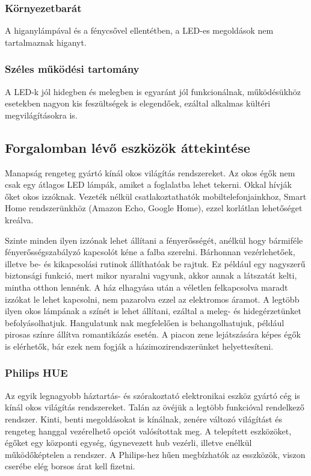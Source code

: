 \documentclass[../main.tex]{subfiles}
\begin{document}
        \subsubsection{Környezetbarát}
            A higanylámpával és a fénycsővel ellentétben, a LED-es megoldások nem tartalmaznak higanyt.
        \subsubsection{Széles működési tartomány}
            A LED-k jól hidegben és melegben is egyaránt jól funkcionálnak, működésükhöz esetekben nagyon kis feszültségek is elegendőek, ezáltal alkalmas kültéri megvilágításokra is.
    
    \subsection{Forgalomban lévő eszközök áttekintése}
        Manapság rengeteg gyártó kínál okos világítás rendszereket. %
        Az okos égők nem csak egy átlagos LED lámpák, amiket a foglalatba lehet tekerni. Okkal hívják őket okos izzóknak. Vezeték nélkül csatlakoztathatók mobiltelefonjainkhoz, Smart Home rendszerünkhöz (Amazon Echo, Google Home), ezzel korlátlan lehetőséget kreálva. 
        
        Szinte minden ilyen izzónak lehet állítani a fényerősségét, anélkül hogy bármiféle fényerősségszabályzó kapcsolót kéne a falba szerelni. Bárhonnan vezérlehetőek, illetve be- és kikapcsolási rutinok állíthatóak be rajtuk. Ez például egy nagyszerű biztonsági funkció, mert mikor nyaralni vagyunk, akkor annak a látszatát kelti, mintha otthon lennénk. A ház elhagyása után a véletlen felkapcsolva maradt izzókat le lehet kapcsolni, nem pazarolva ezzel az elektromos áramot. A legtöbb ilyen okos lámpának a színét is lehet állítani, ezáltal a meleg- és hidegérzetünket befolyásolhatjuk. Hangulatunk nak megfelelően is behangolhatujuk, például pirosas színre állítva romantikázás esetén. A piacon zene lejátszására képes égők is elérhetők, bár ezek nem fogják a házimozirendszerünket helyettesíteni. 
        
            
        \subsubsection{Philips HUE} %
            Az egyik legnagyobb háztartás- és  szórakoztató elektronikai eszköz gyártó cég is kínál okos világítás rendszereket. Talán az övéjük a legtöbb funkcióval rendelkező rendszer. Kinti, benti megoldásokat is kínálnak, zenére változó világítást és rengeteg hanggal vezérelhető opciót valósítottak meg. A telepített eszközöket, égőket egy központi egység, úgynevezett hub vezérli, illetve enélkül működőképtelen a rendszer. A Philips-hez hűen megbízhatók az esszközök, viszon cserébe elég borsos árat kell fizetni. 
            
\end{document}
